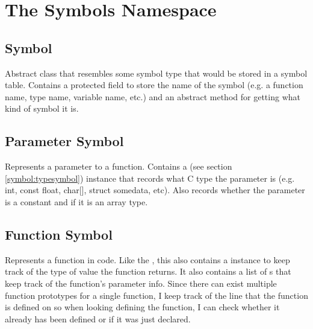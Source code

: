 \documentclass{article}
\begin{document}
\section{The Symbols Namespace}
\label{symbols:namespace}

\subsection{Symbol}
\label{symbol:symbol}
Abstract class that resembles some symbol type that would be stored in a symbol table.
Contains a protected field to store the name of the symbol (e.g. a function name, type name, variable name, etc.) and an abstract method for getting what kind of symbol it is.

\subsection{Parameter Symbol}
\label{symbol:parametersymbol}
Represents a parameter to a function.
Contains a  (see section \ref{symbol:typesymbol}) instance that records what C type the parameter is (e.g. int, const float, char[], struct somedata, etc).
Also records whether the parameter is a constant and if it is an array type.

\subsection{Function Symbol}
\label{symbol:functionsymbol}
Represents a function in code.
Like the , this also contains a  instance to keep track of the type of value the function returns.
It also contains a list of s that keep track of the function's parameter info.
Since there can exist multiple function prototypes for a single function, I keep track of the line that the function is defined on so when looking defining the function, I can check whether it already has been defined or if it was just declared.
\end{document}
